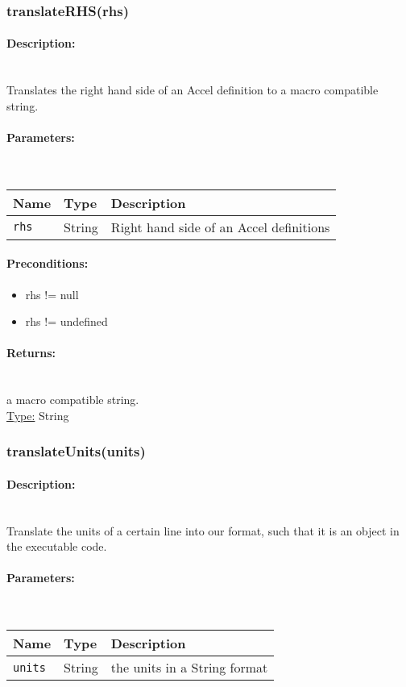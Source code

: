 \subsubsection{translateRHS(rhs)} 
\paragraph{Description:} \hfill \\ 
Translates the right hand side of an Accel definition to a macro compatible string.
\paragraph{Parameters:} \hfill \\ 
\begin{tabular}{|l|l|l|}
\hline
\textbf{Name} & \textbf{Type} & \textbf{Description} \\ 
\hline
\texttt{rhs} & String & Right hand side of an Accel definitions\\ 
\hline
\end{tabular}
\paragraph{Preconditions:} 
\begin{itemize}  
\item  rhs != null
\item  rhs != undefined
\end{itemize}  
\paragraph{Returns:} \hfill \\ 
a macro compatible string.\\ 
\underline{Type:} String
\subsubsection{translateUnits(units)} 
\paragraph{Description:} \hfill \\ 
Translate the units of a certain line into our format, such
that it is an object in the executable code.
\paragraph{Parameters:} \hfill \\ 
\begin{tabular}{|l|l|l|}
\hline
\textbf{Name} & \textbf{Type} & \textbf{Description} \\ 
\hline
\texttt{units} & String & the units in a String format\\ 
\hline
\end{tabular}
